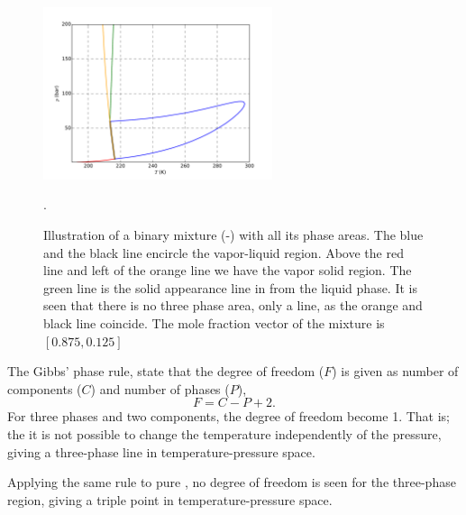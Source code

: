 \documentclass[english]{../thermomemo/thermomemo}
\begin{document}
\begin{figure}[ht]
  \centering
  \includegraphics[width=0.6\textwidth]{envelope2}
  \caption{Illustration of a binary mixture (-) with all
    its phase areas. The blue and the black line encircle the
    vapor-liquid region. Above the red line and left of the orange
    line we have the vapor solid region. The green line is the solid
    appearance line in from the liquid phase. It is seen that there is
    no three phase area, only a line, as the orange and black line
    coincide. The mole fraction vector of the mixture is
    $\left[0.875,0.125\right]$}.
  \label{fig:envelope2}
\end{figure}

The Gibbs' phase rule, state that the degree of freedom ($F$) is given
as number of components ($C$) and number of phases ($P$),
\begin{equation}
  F = C - P + 2.
\end{equation}
For three phases and two components, the degree of freedom
become 1. That is; the it is not possible to change the temperature
independently of the pressure, giving a three-phase line in
temperature-pressure space.

Applying the same rule to pure , no degree of freedom is seen
for the three-phase region, giving a triple point in
temperature-pressure space.

% 
% 
\end{document}
